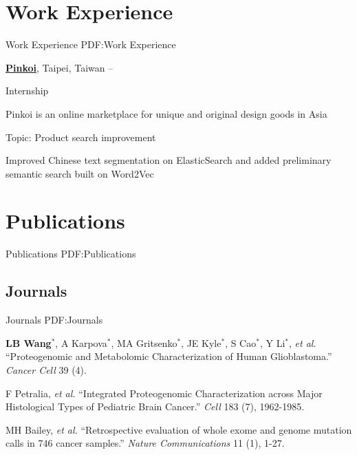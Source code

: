 \documentclass[a4paper,12pt,oneside]{article}
\begin{document}
\begin{body}

\section{Work Experience}
{Work Experience}
{PDF:Work Experience}

\href{http://pinkoi.com}
{\textbf{Pinkoi}},
Taipei, Taiwan
\hfill
{} --
\par
Internship
\begin{detail}
    \begin{detailitem}
    \item Pinkoi is an online marketplace for unique and original design goods in Asia
    \item Topic: Product search improvement
    \item Improved Chinese text segmentation on ElasticSearch and added
        preliminary semantic search built on Word2Vec
    \end{detailitem}
\end{detail}



\section{Publications}
{Publications}
{PDF:Publications}

\subsection{Journals}
{Journals}
{PDF:Journals}

\begin{publication}[series=pub, widest*=100]
    \item
        \textbf{LB Wang}$^*$, A Karpova$^*$, MA Gritsenko$^*$, JE Kyle$^*$, S Cao$^*$, Y Li$^*$, \textit{et al.}
        ``Proteogenomic and Metabolomic Characterization of Human Glioblastoma.''
        \textit{Cancer Cell} 39 (4).

    \item
        F Petralia, \textit{et al.}
        ``Integrated Proteogenomic Characterization across Major Histological Types of Pediatric Brain Cancer.''
        \textit{Cell} 183 (7), 1962-1985.

    \item
        MH Bailey, \textit{et al.}
        ``Retrospective evaluation of whole exome and genome mutation calls in 746 cancer samples.''
        \textit{Nature Communications} 11 (1), 1-27.


\end{publication}
\end{body}
\end{document}
